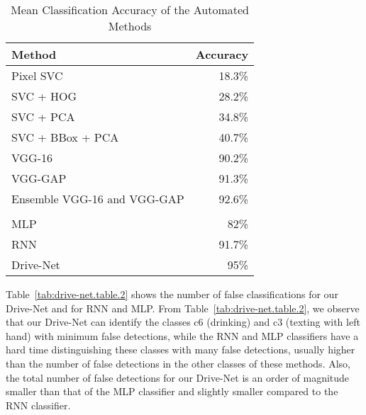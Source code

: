 \begin{table}[]
\centering
\caption{Mean Classification Accuracy of the Automated Methods}%
\label{tab:drive-net.table.1}
\begin{tabular}{@{}lr@{}}
\toprule
\textbf{Method}             & \textbf{Accuracy} \\ \midrule
Pixel SVC                   & 18.3\%            \\
SVC + HOG                   & 28.2\%            \\
SVC + PCA                   & 34.8\%            \\
SVC + BBox + PCA            & 40.7\%            \\
VGG-16                      & 90.2\%            \\
VGG-GAP                     & 91.3\%            \\
Ensemble VGG-16 and VGG-GAP & 92.6\%            \\
\multicolumn{2}{l}{\cellcolor[HTML]{C0C0C0}}    \\
MLP                         & 82\%              \\
RNN                         & 91.7\%            \\
Drive-Net                   & 95\%              \\ \bottomrule
\end{tabular}
\end{table}

Table~\ref{tab:drive-net.table.2} shows the number of false classifications for our Drive-Net and for RNN and MLP\@. From Table~\ref{tab:drive-net.table.2}, we observe that our Drive-Net can identify the classes c6 (drinking) and c3 (texting with left hand) with minimum false detections, while the RNN and MLP classifiers have a hard time distinguishing these classes with many false detections, usually higher than the number of false detections in the other classes of these methods. Also, the total number of false detections for our Drive-Net is an order of magnitude smaller than that of the MLP classifier and slightly smaller compared to the RNN classifier.

